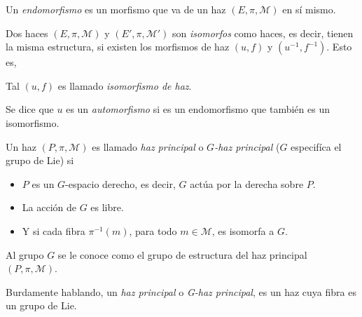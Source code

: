 \begin{mydef}[Endomorfismo]  \cite{Baez}
Un \emph{endomorfismo} es un morfismo que va de un haz $(E, \pi, \mathcal{M})$ en s\'{i} mismo.
\end{mydef}

\begin{mydef}[Isomorfismo]
Dos haces $(E, \pi, \mathcal{M})$ y $(E', \pi, \mathcal{M}')$ son \emph{isomorfos} como haces, es decir, tienen la misma estructura, si existen los morfismos de haz $(u, f)$ y $(u^{-1}, f^{-1})$. Esto es,
%
\begin{center}
\end{center}
%
Tal $(u, f)$ es llamado \emph{isomorfismo de haz}.
\end{mydef}

\begin{mydef}[Automorfismo]
Se dice que $u$ es un \emph{automorfismo} si es un endomorfismo que tambi\'{e}n es un isomorfismo.
\end{mydef}

\begin{mydef}  \cite{Kobayashi}
Un haz $(P, \pi, \mathcal{M})$ es llamado \emph{haz principal} o \emph{$G$-haz principal} ($G$ especif\'{i}ca el grupo de Lie) si
\begin{itemize}
\item{$P$ es un $G$-espacio derecho, es decir, $G$ act\'{u}a por la derecha sobre $P$.}
\item{La acci\'{o}n de $G$ es libre.}
\item{Y si cada fibra $\pi^{-1}(m)$, para todo $m \in \mathcal{M}$, es isomorfa a $G$.}
\end{itemize}
Al grupo $G$ se le conoce como el grupo de estructura del haz principal $(P, \pi, \mathcal{M})$.
\end{mydef}

Burdamente hablando, un \emph{haz principal} o \emph{G-haz principal}, es un haz cuya fibra es un grupo de Lie.